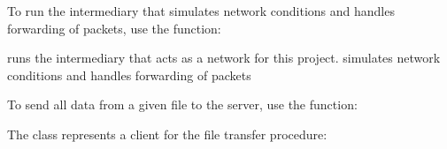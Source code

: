 \documentclass[letterpaper,10pt,english,openany,oneside]{sphinxmanual}
\begin{document}
\sphinxAtStartPar
To run the intermediary that simulates network conditions and handles forwarding of packets, use the  function:

\begin{fulllineitems}
\label{\detokenize{index:intermediary.run_intermediary}}
\pysigstartsignatures
\pysiglinewithargsret
{}
{}
{}
\pysigstopsignatures
\sphinxAtStartPar
runs the intermediary that acts as a network for this project. simulates network conditions
and handles forwarding of packets

\end{fulllineitems}


\sphinxAtStartPar
To send all data from a given file to the server, use the  function:

\sphinxAtStartPar
The  class represents a client for the file transfer procedure:
\end{document}
